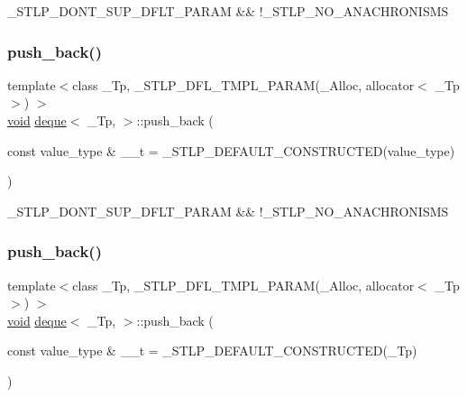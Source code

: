 \+\_\+\+S\+T\+L\+P\+\_\+\+D\+O\+N\+T\+\_\+\+S\+U\+P\+\_\+\+D\+F\+L\+T\+\_\+\+P\+A\+R\+AM \&\& !\+\_\+\+S\+T\+L\+P\+\_\+\+N\+O\+\_\+\+A\+N\+A\+C\+H\+R\+O\+N\+I\+S\+MS \mbox{\label{classdeque_ad0624acc579c05c1df04b107fe283bb9}} 
\subsubsection{\texorpdfstring{push\+\_\+back()}{push\_back()}\hspace{0.1cm}{\footnotesize\ttfamily [1/2]}}
{\footnotesize\ttfamily template$<$class \+\_\+\+Tp, \+\_\+\+S\+T\+L\+P\+\_\+\+D\+F\+L\+\_\+\+T\+M\+P\+L\+\_\+\+P\+A\+R\+A\+M(\+\_\+\+Alloc, allocator$<$ \+\_\+\+Tp $>$) $>$ \\
\hyperlink{interfacevoid}{void} \hyperlink{classdeque}{deque}$<$ \+\_\+\+Tp, $>$\+::push\+\_\+back (\begin{DoxyParamCaption}\item[{const value\+\_\+type \&}]{\+\_\+\+\_\+t = {\ttfamily \+\_\+STLP\+\_\+DEFAULT\+\_\+CONSTRUCTED(value\+\_\+type)} }\end{DoxyParamCaption})\hspace{0.3cm}{\ttfamily [inline]}}

\+\_\+\+S\+T\+L\+P\+\_\+\+D\+O\+N\+T\+\_\+\+S\+U\+P\+\_\+\+D\+F\+L\+T\+\_\+\+P\+A\+R\+AM \&\& !\+\_\+\+S\+T\+L\+P\+\_\+\+N\+O\+\_\+\+A\+N\+A\+C\+H\+R\+O\+N\+I\+S\+MS \mbox{\label{classdeque_a365cc9bed82b9ce3baec754a2c5534c7}} 
\subsubsection{\texorpdfstring{push\+\_\+back()}{push\_back()}\hspace{0.1cm}{\footnotesize\ttfamily [2/2]}}
{\footnotesize\ttfamily template$<$class \+\_\+\+Tp, \+\_\+\+S\+T\+L\+P\+\_\+\+D\+F\+L\+\_\+\+T\+M\+P\+L\+\_\+\+P\+A\+R\+A\+M(\+\_\+\+Alloc, allocator$<$ \+\_\+\+Tp $>$) $>$ \\
\hyperlink{interfacevoid}{void} \hyperlink{classdeque}{deque}$<$ \+\_\+\+Tp, $>$\+::push\+\_\+back (\begin{DoxyParamCaption}\item[{const value\+\_\+type \&}]{\+\_\+\+\_\+t = {\ttfamily \+\_\+STLP\+\_\+DEFAULT\+\_\+CONSTRUCTED(\+\_\+Tp)} }\end{DoxyParamCaption})\hspace{0.3cm}{\ttfamily [inline]}}

